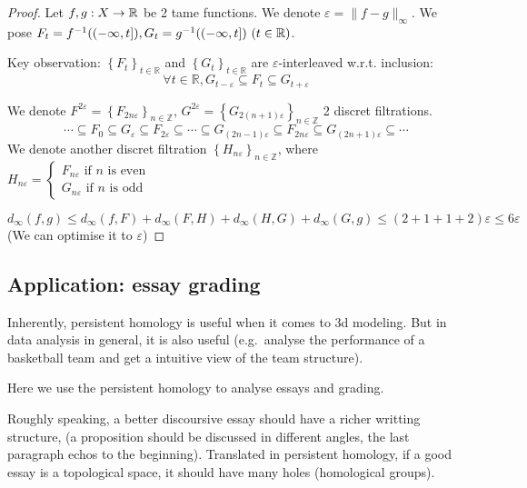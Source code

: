 \begin{proof}
  Let $f, g : X \to \mathbb{R}$ be 2 tame functions. We denote $\varepsilon = \|f-g\|_\infty$.
  We pose $F_t = f^{-1}((-\infty, t]), G_t = g^{-1}((-\infty, t])~(t\in \mathbb{R})$.

  Key observation: $\left\{F_t\right\}_{t \in \mathbb{R}}$ and $\left\{G_t\right\}_{t \in \mathbb{R}}$
  are $\varepsilon$-interleaved w.r.t. inclusion:\\
  $$
  \forall t \in \mathbb{R}, G_{t-\varepsilon} \subseteq F_t \subseteq G_{t+\varepsilon}
  $$

  We denote
  $F^{2 \varepsilon}=\left\{F_{2 n \varepsilon}\right\}_{n \in \mathbb{Z}}$,
  $G^{2 \varepsilon}=\left\{G_{2(n+1) \varepsilon}\right\}_{n \in \mathbb{Z}}$
  2 discret filtrations.
  $$
  \cdots \subseteq F_0 \subseteq G_{\varepsilon} \subseteq F_{2 \varepsilon} \subseteq \cdots \subseteq G_{(2 n-1) \varepsilon} \subseteq F_{2 n \varepsilon} \subseteq G_{(2 n+1) \varepsilon} \subseteq \cdots
  $$
  We denote another discret filtration $\left\{H_{n \varepsilon}\right\}_{n \in \mathbb{Z}}$, where $H_{n \varepsilon}=\left\{\begin{array}{l}F_{n \varepsilon} \text { if } n \text { is even } \\ G_{n \varepsilon} \text { if } n \text { is odd }\end{array}\right.$

  $$
  d_\infty(f, g) \le d_\infty(f, F) + d_\infty(F, H) + d_\infty(H, G) + d_\infty(G, g)
  \le (2+1+1+2)\varepsilon \le 6\varepsilon
  $$
  (We can optimise it to $\varepsilon$)
  
\end{proof}

\subsection{Application: essay grading}

Inherently, persistent homology is useful when it comes to 3d modeling.
But in data analysis in general, it is also useful (e.g.\ analyse the
performance of a basketball team and get a intuitive view of the team structure).

Here we use the persistent homology to analyse essays and grading.

Roughly speaking, a better discoursive essay should have a
richer writting structure, (a proposition should be discussed
in different angles, the last paragraph echos to the beginning).
Translated in persistent homology,
if a good essay is a topological space, it should have
many holes (homological groups).

